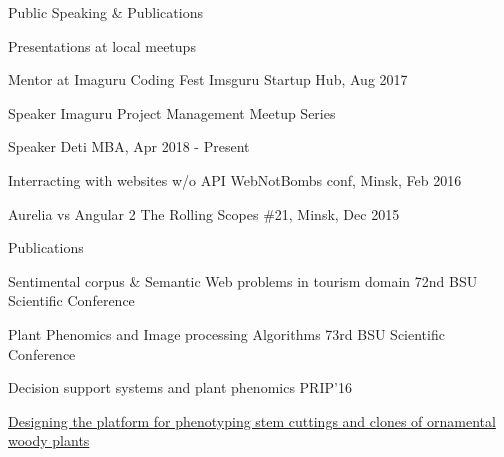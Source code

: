 \documentclass{resume} %
\begin{document}
\begin{rSection}{Public Speaking & Publications}

    \begin{rSubsection}{Presentations at local meetups}{}{}

    \item Mentor at Imaguru Coding Fest \hfill Imsguru Startup Hub, Aug 2017
    \item Speaker \hfill Imaguru Project Management Meetup Series
    \item Speaker \hfill Deti MBA, Apr 2018 - Present
    \item Interracting with websites w/o API \hfill WebNotBombs conf, Minsk, Feb 2016
    \item Aurelia vs Angular 2 \hfill The Rolling Scopes \#21, Minsk, Dec 2015


    \end{rSubsection}

    \begin{rSubsection}{Publications}{}{}

    \item Sentimental corpus \& Semantic Web problems in tourism domain \hfill 72nd BSU Scientific Conference
    \item Plant Phenomics and Image processing Algorithms \hfill 73rd BSU Scientific Conference
    \item Decision support systems and plant phenomics \hfill PRIP'16
    \item \href{http://textlab.io/doc/8452214}{Designing the platform for phenotyping stem cuttings and clones of ornamental woody plants}
    \end{rSubsection}
\end{rSection}






\end{document}
